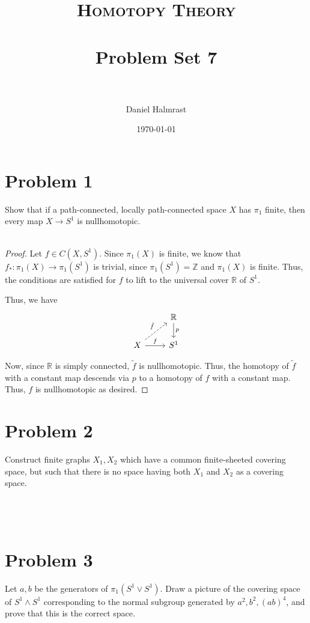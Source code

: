 \documentclass[fontsize=11pt]{scrartcl} %
\title{	
\normalfont \normalsize 
\textsc{Homotopy Theory} \\ [25pt] %
\horrule{0.5pt} \\[0.4cm] %
\huge Problem Set 7 \\ %
\horrule{2pt} \\[0.5cm] %
}
\author{Daniel Halmrast} %
\date{\normalsize\today} %
\numberwithin{equation}{section} %
\numberwithin{figure}{section} %
\numberwithin{table}{section} %
\newcommand{\R}{\mathbb{R}}
\newcommand{\Z}{\mathbb{Z}}
\begin{document}
\maketitle %

\section*{Problem 1}
Show that if a path-connected, locally path-connected space $X$ has $\pi_1$
finite, then every map $X\to S^1$ is nullhomotopic.
\\
\\
\begin{proof}
    Let $f\in C(X,S^1)$. Since $\pi_1(X)$ is finite, we know that
    $f_*:\pi_1(X)\to\pi_1(S^1)$ is trivial, since $\pi_1(S^1) = \Z$ and
    $\pi_1(X)$ is finite. Thus, the conditions are satisfied for $f$ to lift to
    the universal cover $\R$ of $S^1$.

    Thus, we have
    \[
\begin{tikzcd}
    &\R\arrow{d}{p}\\
    X\arrow{r}{f}\arrow[dashed]{ru}{\tilde{f}} &S^1
\end{tikzcd}
    \]

    Now, since $\R$ is simply connected, $\tilde{f}$ is nullhomotopic. Thus, the
    homotopy of $\tilde{f}$ with a constant map descends via $p$ to a homotopy
    of $f$ with a constant map. Thus, $f$ is nullhomotopic as desired.
\end{proof}

\section*{Problem 2}
Construct finite graphs $X_1,X_2$ which have a common finite-sheeted covering
space, but such that there is no space having both $X_1$ and $X_2$ as a covering
space.
\\
\\
\\
\\
\newpage

\section*{Problem 3}
Let $a,b$ be the generators of $\pi_1(S^1\vee S^1)$. Draw a picture of the
covering space of $S^1\wedge S^1$ corresponding to the normal subgroup generated
by $a^2,b^2,(ab)^4$, and prove that this is the correct space.
\\
\\
\newpage
\end{document}
